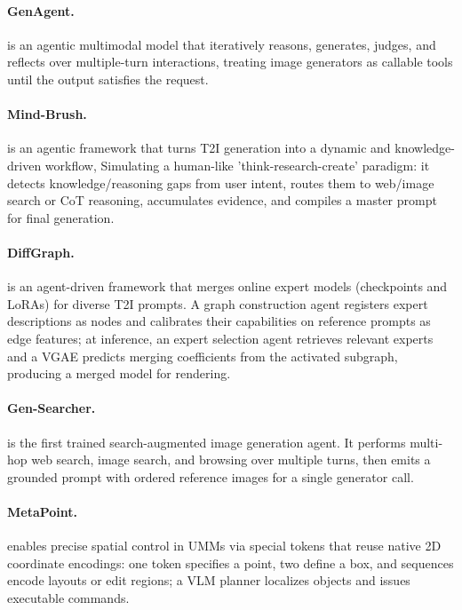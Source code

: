 \paragraph{GenAgent.}
 is an agentic multimodal model that iteratively reasons, generates, judges, and reflects over multiple-turn interactions, treating image generators as callable tools until the output satisfies the request. ~\cite{jiang2026genagent}

\paragraph{Mind-Brush.}
 is an agentic framework that turns T2I generation into a dynamic and knowledge-driven workflow, Simulating a human-like ’think-research-create’ paradigm: it detects knowledge/reasoning gaps from user intent, routes them to web/image search or CoT reasoning, accumulates evidence, and compiles a master prompt for final generation. ~\cite{avg260201756}

\paragraph{DiffGraph.}
 is an agent-driven framework that merges online expert models (checkpoints and LoRAs) for diverse T2I prompts. A graph construction agent registers expert descriptions as nodes and calibrates their capabilities on reference prompts as edge features; at inference, an expert selection agent retrieves relevant experts and a VGAE predicts merging coefficients from the activated subgraph, producing a merged model for rendering.~\cite{avg260320470}

\paragraph{Gen-Searcher.}
 is the first trained search-augmented image
generation agent. It performs multi-hop web search, image search, and browsing over multiple turns, then emits a grounded prompt with ordered reference images for a single generator call. ~\cite{avg260328767}

\paragraph{MetaPoint.}
 enables precise spatial control in UMMs via special tokens that reuse native 2D coordinate encodings: one token specifies a point, two define a box, and sequences encode layouts or edit regions; a VLM planner localizes objects and issues executable commands. ~\cite{zhou2026metapoint}


